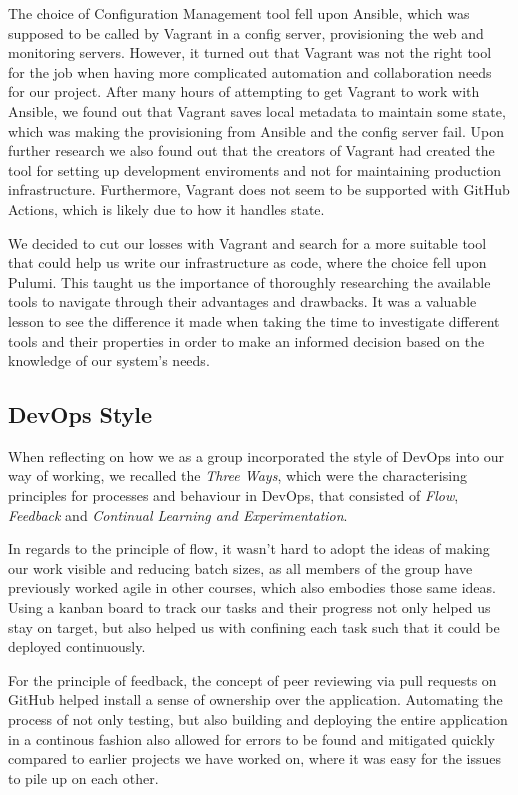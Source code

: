 The choice of Configuration Management tool fell upon Ansible, which was supposed to be called by Vagrant in a config server, provisioning the web and monitoring servers.
However, it turned out that Vagrant was not the right tool for the job when having more complicated automation and collaboration needs for our project.
After many hours of attempting to get Vagrant to work with Ansible, we found out that Vagrant saves local metadata to maintain some state, which was making the provisioning from Ansible and the config server fail\cite{issue178-vagrant-ansible}. Upon further research we also found out that the creators of Vagrant had created the tool for setting up development enviroments and not for maintaining production infrastructure. Furthermore, Vagrant does not seem to be supported with GitHub Actions, which is likely due to how it handles state.

We decided to cut our losses with Vagrant and search for a more suitable tool that could help us write our infrastructure as code,
where the choice fell upon Pulumi.
This taught us the importance of thoroughly researching the available tools to navigate through their advantages and drawbacks. 
It was a valuable lesson to see the difference it made when taking the time to investigate different tools and their properties in order to make an informed decision based on the knowledge of our system's needs.

\subsection{DevOps Style}
When reflecting on how we as a group incorporated the style of DevOps into our way of working, we recalled the \textit{Three Ways}, which were the characterising principles for processes and behaviour in DevOps, that consisted of \textit{Flow}, \textit{Feedback} and \textit{Continual Learning and Experimentation}\cite{devopshandbook}.

In regards to the principle of flow, it wasn't hard to adopt the ideas of making our work visible and reducing batch sizes, as all members of the group have previously worked agile in other courses, which also embodies those same ideas. Using a kanban board to track our tasks and their progress not only helped us stay on target, but also helped us with confining each task such that it could be deployed continuously\cite{devopshandbook}.

For the principle of feedback, the concept of peer reviewing via pull requests on GitHub helped install a sense of ownership over the application. Automating the process of not only testing, but also building and deploying the entire application in a continous fashion also allowed for errors to be found and mitigated quickly compared to earlier projects we have worked on, where it was easy for the issues to pile up on each other.

